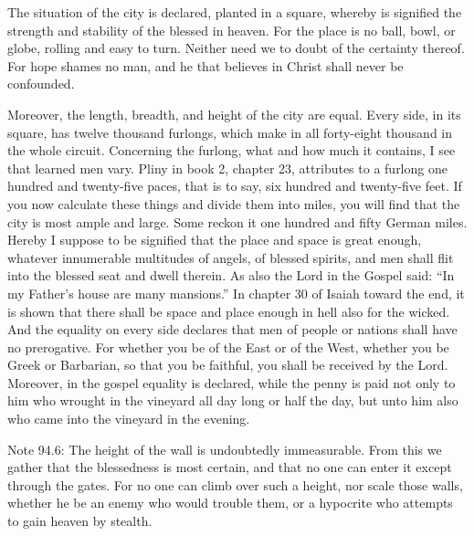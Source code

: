The situation of the city is declared, planted in a square, whereby is signified the strength and stability of the blessed in heaven. For the place is no ball, bowl, or globe, rolling and easy to turn. Neither need we to doubt of the certainty thereof. For hope shames no man, and he that believes in Christ shall never be confounded.

Moreover, the length, breadth, and height of the city are equal. Every side, in its square, has twelve thousand furlongs, which make in all forty-eight thousand in the whole circuit. Concerning the furlong, what and how much it contains, I see that learned men vary. Pliny in book 2, chapter 23, attributes to a furlong one hundred and twenty-five paces, that is to say, six hundred and twenty-five feet. If you now calculate these things and divide them into miles, you will find that the city is most ample and large. Some reckon it one hundred and fifty German miles. Hereby I suppose to be signified that the place and space is great enough, whatever innumerable multitudes of angels, of blessed spirits, and men shall flit into the blessed seat and dwell therein. As also the Lord in the Gospel said: “In my Father’s house are many mansions.” In chapter 30 of Isaiah toward the end, it is shown that there shall be space and place enough in hell also for the wicked. And the equality on every side declares that men of people or nations shall have no prerogative. For whether you be of the East or of the West, whether you be Greek or Barbarian, so that you be faithful, you shall be received by the Lord. Moreover, in the gospel equality is declared, while the penny is paid not only to him who wrought in the vineyard all day long or half the day, but unto him also who came into the vineyard in the evening.

Note 94.6: The height of the wall is undoubtedly immeasurable. From this we gather that the blessedness is most certain, and that no one can enter it except through the gates. For no one can climb over such a height, nor scale those walls, whether he be an enemy who would trouble them, or a hypocrite who attempts to gain heaven by stealth.

